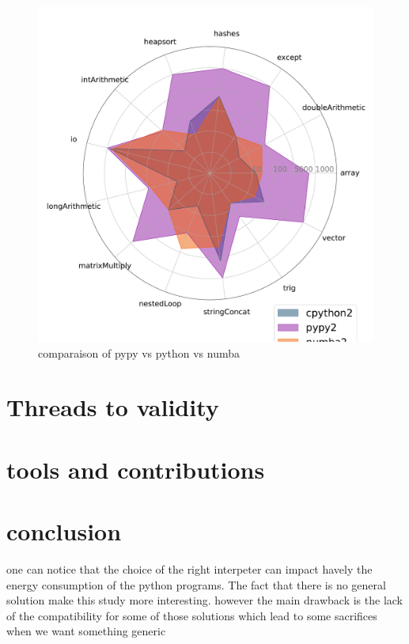 \begin{figure}[thb]
    \centering
    \includegraphics[width=\linewidth]{imgs/tommti_compare__cpython2_pypy2_numba2}
    \caption{comparaison of pypy vs python vs numba }
    \label{fig:p2}
\end{figure}


\section{Threads to validity}
\section{tools and contributions}



\section{conclusion}

one can notice that the choice of the right interpeter can impact havely the energy consumption of the python programs. The fact that there is no general solution make this study more interesting. however the main drawback is the lack of the compatibility for some of those solutions which lead to some sacrifices when we want something generic